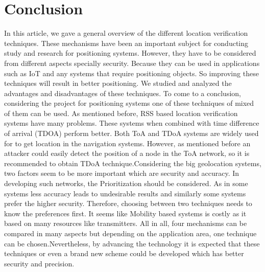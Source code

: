 \documentclass[conference]{IEEEtran}
\begin{document}
\section{Conclusion}
In this article, we gave a general overview of the different location verification techniques. These mechanisms have been an important subject for conducting study and research for positioning systems. However, they have to be considered from different aspects specially security. Because they can be used in applications such as IoT and any systems that require positioning objects. So improving these techniques will result in better positioning. We studied and analyzed the advantages and disadvantages of these techniques. To come to a conclusion, considering the project for positioning systems one of these techniques of mixed of them can be used. 
As mentioned before, RSS based location verification systems have many problems. These systems when combined with time difference of arrival (TDOA) perform better. Both ToA and TDoA systems are widely used for to get location in the navigation systems. However, as mentioned before an attacker could easily detect the position of a node in the ToA network, so it is recommended to obtain TDoA technique.Considering the big geolocation systems, two factors seem to be more important which are security and accuracy. In developing such networks, the Prioritization should be considered. As in some systems less accuracy leads to undesirable results and similarly some systems prefer the higher security. Therefore, choosing between two techniques needs to know the preferences first. It seems like Mobility based systems is costly as it based on many resources like transmitters.
All in all, four mechanisms can be compared in many aspects but depending on the application area, one technique can be chosen.Nevertheless, by advancing the technology it is expected that these techniques or even a brand new scheme could be developed which has better security and precision.
\end{document}
